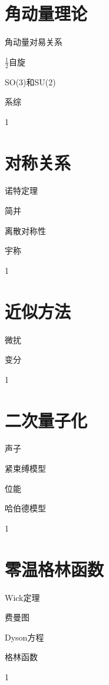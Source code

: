 \documentclass[lang=cn,newtx,10pt,scheme=chinese,thmcnt=section]{elegantbook}
\begin{document}
\chapter{角动量理论}
\begin{introduction}
	\item 角动量对易关系
	\item $\frac12$自旋
	\item SO(3)和SU(2)
	\item 系综
\end{introduction}
1

\chapter{对称关系}
\begin{introduction}
	\item 诺特定理
	\item 简并
	\item 离散对称性
	\item 宇称
\end{introduction}
1

\chapter{近似方法}
\begin{introduction}
	\item 微扰
	\item 变分
\end{introduction}
1

\chapter{二次量子化}
\begin{introduction}
	\item 声子
	\item 紧束缚模型
	\item 位能
	\item 哈伯德模型
\end{introduction}
1

\chapter{零温格林函数}
\begin{introduction}
	\item Wick定理
	\item 费曼图
	\item Dyson方程
	\item 格林函数
\end{introduction}
1
\end{document}
